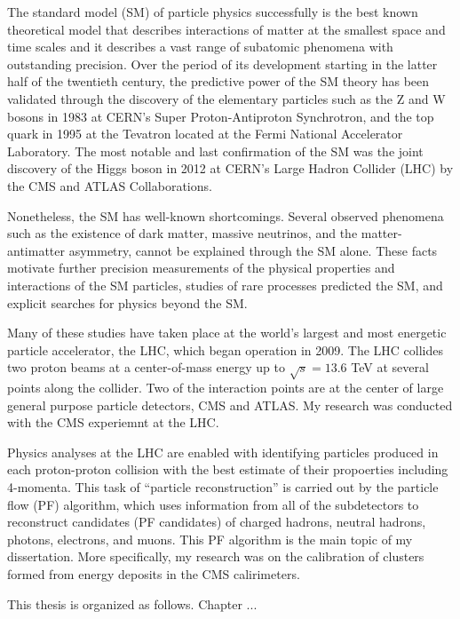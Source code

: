 
The standard model (SM) of particle physics successfully is the best known theoretical model that describes interactions of matter at the smallest space and time scales
and it describes a vast range of subatomic phenomena with outstanding precision.
Over the period of its development starting in the latter half of the twentieth century, the predictive power of the SM theory has been validated through the discovery of the elementary particles such as the Z and W bosons in 1983 at CERN's Super Proton-Antiproton Synchrotron, and the top quark in 1995 at the Tevatron located at the Fermi National Accelerator Laboratory.
The most notable and last confirmation of the SM was the joint discovery of the Higgs boson in 2012 at CERN's Large Hadron Collider (LHC) by the CMS and ATLAS Collaborations.

Nonetheless, the SM has well-known shortcomings.
Several observed phenomena such as the existence of dark matter, massive neutrinos, and the matter-antimatter asymmetry, cannot be explained through the SM alone.
These facts motivate further precision measurements of the physical properties and interactions of the SM particles, studies of rare processes predicted the SM, and explicit searches for physics beyond the SM.

Many of these studies have taken place at the world's largest and most energetic particle accelerator, the LHC, which began operation in 2009.
The LHC collides two proton beams at a center-of-mass energy up to $\sqrt{s}=13.6$ TeV at several points along the collider.
Two of the interaction points are at the center of large general purpose particle detectors, CMS and ATLAS.
My research was conducted with the CMS experiemnt at the LHC.

Physics analyses at the LHC are enabled with identifying particles produced in each proton-proton collision with the best estimate of their propoerties including 4-momenta.
This task of ``particle reconstruction'' is carried out by the particle flow (PF) algorithm, which uses information from all of the subdetectors
to reconstruct candidates (PF candidates) of charged hadrons, neutral hadrons, photons, electrons, and muons.
This PF algorithm is the main topic of my dissertation.
More specifically, my research was on the calibration of clusters formed from energy deposits in the CMS calirimeters.

This thesis is organized as follows. Chapter ...~

